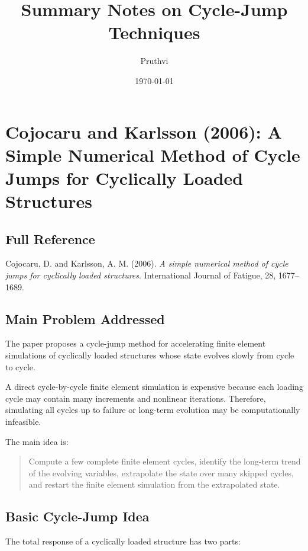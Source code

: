 ﻿\documentclass[11pt,a4paper]{article}
\title{\textbf{Summary Notes on Cycle-Jump Techniques}}
\author{Pruthvi}
\date{\today}
\begin{document}
\maketitle

\tableofcontents
\newpage

\section{Cojocaru and Karlsson (2006): A Simple Numerical Method of Cycle Jumps for Cyclically Loaded Structures}

\subsection{Full Reference}

Cojocaru, D. and Karlsson, A. M. (2006).
\textit{A simple numerical method of cycle jumps for cyclically loaded structures}.
International Journal of Fatigue, 28, 1677--1689.

\subsection{Main Problem Addressed}

The paper proposes a cycle-jump method for accelerating finite element simulations of cyclically loaded structures whose state evolves slowly from cycle to cycle.

A direct cycle-by-cycle finite element simulation is expensive because each loading cycle may contain many increments and nonlinear iterations. Therefore, simulating all cycles up to failure or long-term evolution may be computationally infeasible.

The main idea is:

\begin{quote}
Compute a few complete finite element cycles, identify the long-term trend of the evolving variables, extrapolate the state over many skipped cycles, and restart the finite element simulation from the extrapolated state.
\end{quote}

\subsection{Basic Cycle-Jump Idea}

The total response of a cyclically loaded structure has two parts:
\end{document}
